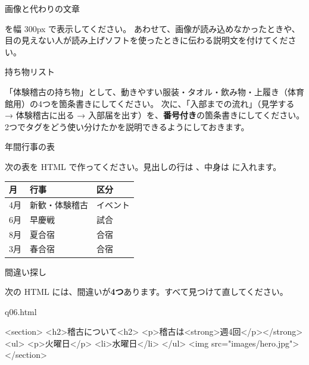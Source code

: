 \begin{exercise}[1]{画像と代わりの文章}
\toanswer\par
{} を幅 300px で表示してください。
あわせて、画像が読み込めなかったときや、目の見えない人が読み上げソフトを使ったときに伝わる説明文を付けてください。
\end{exercise}

\begin{exercise}[2]{持ち物リスト}
\toanswer\par
「体験稽古の持ち物」として、動きやすい服装・タオル・飲み物・上履き（体育館用）の4つを箇条書きにしてください。
次に、「入部までの流れ」（見学する → 体験稽古に出る → 入部届を出す）を、\textbf{番号付き}の箇条書きにしてください。
2つでタグをどう使い分けたかを説明できるようにしておきます。
\end{exercise}

\begin{exercise}[2]{年間行事の表}
\toanswer\par
次の表を HTML で作ってください。見出しの行は 、中身は  に入れます。
\begin{center}\small
\begin{tabular}{lll}\toprule
月 & 行事 & 区分 \\\midrule
4月 & 新歓・体験稽古 & イベント \\
6月 & 早慶戦 & 試合 \\
8月 & 夏合宿 & 合宿 \\
3月 & 春合宿 & 合宿 \\\bottomrule
\end{tabular}
\end{center}
\end{exercise}

\begin{exercise}[2]{間違い探し}
\toanswer\par
次の HTML には、間違いが\textbf{4つ}あります。すべて見つけて直してください。
\begin{filebox}{q06.html}
\begin{Piton}[language=code]
<section>
  <h2>稽古について<h2>
  <p>稽古は<strong>週4回</p></strong>
  <ul>
    <p>火曜日</p>
    <li>水曜日</li>
  </ul>
  <img src="images/hero.jpg">
</section>
\end{Piton}
\end{filebox}
\end{exercise}

